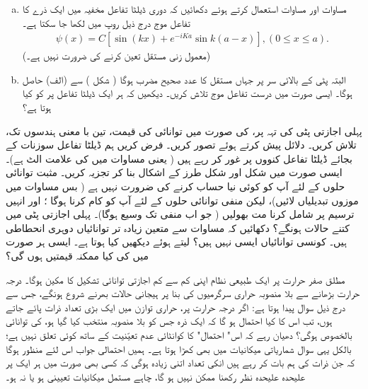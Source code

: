 \begin{enumerate}[a.]
\item
 مساوات  اور مساوات   استعمال کرتے ہوئے دکھائیں کہ دوری ڈیلٹا تفاعل مخفیہ میں ایک ذرے کا تفاعل موج درج ذیل روپ میں لکھا جا سکتا ہے۔
\begin{align*}
	\psi(x) = C[\sin(kx)+e^{-iKa}\sin k(a-x)], (0\leq x\leq a).
\end{align*} 
(معمول زنی مستقل  تعین کرنے کی ضرورت نہیں  ہے۔)
\item
  البتہ پٹی کے بالائی سر پر جہاں  مستقل   کا عدد صحیح مضرب ہوگا ( شکل )  سے (الف)   حاصل ہوگا۔  ایسی صورت میں درست تفاعل موج تلاش کریں۔  دیکھیں  کہ ہر ایک ڈیلٹا تفاعل پر  کو کیا ہوتا ہے؟
\end{enumerate}
پہلی اجازتی پٹی کی تہہ  پر،   کی صورت میں توانائی کی قیمت،  تین با معنی ہندسوں تک،  تلاش کریں۔ دلائل پیش کرتے ہوئے   تصور کریں۔
فرض کریں ہم ڈیلٹا تفاعل سوزنات کے بجائے ڈیلٹا تفاعل کنووں  پر غور کر رہے ہیں ( یعنی مساوات    میں  کی علامت الٹ ہے)۔ ایسی صورت میں
 شکل   اور شکل   طرز کے اشکال بنا کر  تجزیہ کریں۔ مثبت توانائی حلوں کے لئے آپ کو کوئی نیا حساب کرنے کی ضرورت نہیں ہے ( بس مساوات   میں موزوں  تبدیلیاں لائیں)،  لیکن منفی توانائی حلوں کے لئے آپ کو کام کرنا ہوگا ؛ اور انہیں ترسیم پر شامل کرنا مت بھولیں ( جو اب منفی   تک وسیع ہوگا)۔ پہلی اجازتی پٹی میں  کتنے حالات ہونگے؟
دکھائیں کہ مساوات    سے متعین   زیادہ تر توانائیاں دوہری انحطاطی ہیں۔ کونسی توانائیاں  ایسی نہیں ہیں؟   لیتے ہوئے دیکھیں کیا ہوتا ہے۔ ایسی ہر صورت میں  کی کیا  ممکنہ قیمتیں ہوں گی؟


مطلق صفر حرارت پر ایک طبیعی نظام اپنی  کم سے کم اجازتی توانائی  تشکیل کا مکین ہوگا۔ درجہ حرارت بڑھانے سے  بلا منصوبہ حراری سرگرمیوں کی  بنا پر ہیجانی حالات  بھرنے شروع ہونگے،  جس سے درج ذیل سوال پیدا ہوتا ہے: اگر  درجہ حرارت   پر،  حراری توازن میں ایک بڑی تعداد   ذرات پائے جاتے ہوں،  تب اس کا کیا احتمال ہو گا  کہ ایک ذرہ  جس کو بلا منصوبہ منتخب کیا گیا ہو،  کی  توانائی بالخصوص   ہوگی؟  دھیان رہے کہ اس" احتمال"  کا کوانٹائی  عدم تعیّنیت کے ساتھ کوئی تعلق نہیں ہے؛  بالکل یہی سوال    شماریاتی میکانیات میں بھی کھڑا ہوتا ہے۔ ہمیں احتمالی جواب اس لئے منظور ہوگا کہ جن ذرات کی ہم بات کر رہے ہیں انکی تعداد اتنی زیادہ  ہوگی کہ  کسی  بھی  صورت میں  ہر ایک پر علیحدہ علیحدہ   نظر رکھنا ممکن نہیں ہو گا،  چاہے    مستمل  میکانیات  تعیینی  ہو   یا نہ ہو۔

